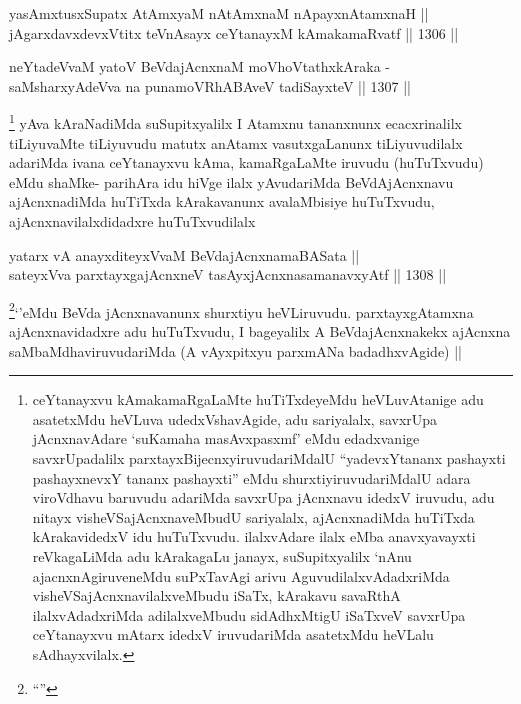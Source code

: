 \begin{shl}
yasAmxtusxSupatx AtAmx\s yaM nA\s \s tAmxnaM nApayxnAtamxnaH || \\
jAgarxdavxdevxVtitx teVnAsayx ceYtanayxM kAmakamaRvatf ||  1306 ||  
\end{shl}
				
\begin{shl}
neYtadeVvaM yatoV BeVdajAcnxnaM moVhoVtathxkAraka -\\
saMsharxyAdeVva na punamoVRhABAveV tadiSayxteV ||  1307 ||  
\end{shl}

\begin{artha}
\footnote{ceYtanayxvu kAmakamaRgaLaMte huTiTxdeyeMdu heVLuvAtanige adu asatetxMdu heVLuva udedxVshavAgide, adu sariyalalx, savxrUpa jAcnxnavAdare `suKamaha masAvxpasxmf' eMdu edadxvanige savxrUpadalilx parxtayxBijecnxyiruvudariMdalU ``yadevxYtananx pashayxti pashayxnevxY tananx pashayxti'' eMdu shurxtiyiruvudariMdalU adara viroVdhavu baruvudu adariMda savxrUpa jAcnxnavu idedxV iruvudu, adu nitayx visheVSajAcnxnaveMbudU sariyalalx, ajAcnxnadiMda huTiTxda kArakavidedxV idu huTuTxvudu. ilalxvAdare ilalx eMba anavxyavayxti reVkagaLiMda adu kArakagaLu janayx, suSupitxyalilx `nAnu ajacnxnAgiruveneMdu suPxTavAgi arivu AguvudilalxvAdadxriMda visheVSajAcnxnavilalxveMbudu iSaTx, kArakavu savaRthA ilalxvAdadxriMda adilalxveMbudu sidAdhxMtigU iSaTxveV savxrUpa ceYtanayxvu mAtarx idedxV iruvudariMda asatetxMdu heVLalu sAdhayxvilalx.}
yAva kAraNadiMda suSupitxyalilx I Atamxnu tananxnunx ecacxrinalilx tiLiyuvaMte tiLiyuvudu matutx anAtamx vasutxgaLanunx tiLiyuvudilalx adariMda ivana ceYtanayxvu kAma, kamaRgaLaMte iruvudu (huTuTxvudu) eMdu shaMke-
parihAra idu hiVge ilalx yAvudariMda BeVdAjAcnxnavu ajAcnxnadiMda huTiTxda kArakavanunx avalaMbisiye huTuTxvudu, ajAcnxnavilalxdidadxre huTuTxvudilalx
\end{artha}


\begin{shl}
yatarx vA anayxditeyxVvaM BeVdajAcnxnamaBASata || \\
sateyxVva parxtayxgajAcnxneV tasAyxjAcnxnasamanavxyAtf ||  1308 ||  
\end{shl}

\begin{artha}
\footnote{``\stext''}`\stext'eMdu BeVda jAcnxnavanunx shurxtiyu heVLiruvudu. parxtayxgAtamxna ajAcnxnavidadxre adu huTuTxvudu, I bageyalilx A BeVdajAcnxnakekx ajAcnxna saMbaMdhaviruvudariMda (A vAyxpitxyu parxmANa badadhxvAgide) ||
\end{artha}

